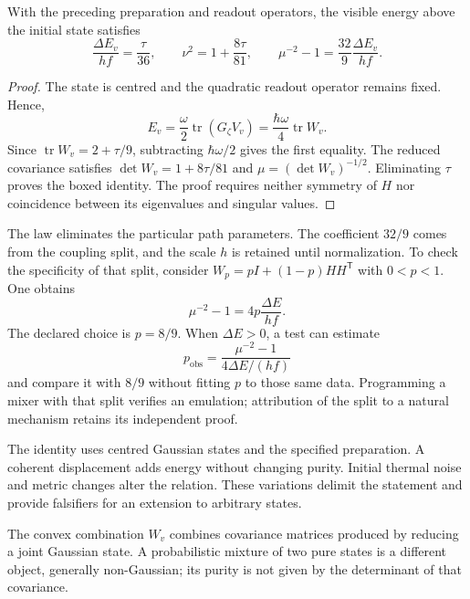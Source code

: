 \begin{proposition}
\label{md:aux:prop-energia-pureza}
With the preceding preparation and readout operators, the visible
energy above the initial state satisfies
\begin{equation}
 \frac{\Delta E_v}{hf}=\frac\tau{36},\qquad
 \nu^2=1+\frac{8\tau}{81},\qquad
 \boxed{\mu^{-2}-1=\frac{32}{9}\frac{\Delta E_v}{hf}.}
 \label{md:aux:identidad-energia-pureza}
\end{equation}
\end{proposition}
\begin{proof}
The state is centred and the quadratic readout operator remains fixed.
Hence,
\[
 E_v=\frac\omega2\operatorname{tr}(G_\zeta V_v)
 =\frac{\hbar\omega}{4}\operatorname{tr}W_v.
\]
Since $\operatorname{tr}W_v=2+\tau/9$, subtracting
$\hbar\omega/2$ gives the first equality.
The reduced covariance satisfies
$\det W_v=1+8\tau/81$ and $\mu=(\det W_v)^{-1/2}$.
Eliminating $\tau$ proves the boxed identity.
The proof requires neither symmetry of $H$ nor coincidence between
its eigenvalues and singular values.
\end{proof}

The law eliminates the particular path parameters.
The coefficient $32/9$ comes from the coupling split, and the scale
$h$ is retained until normalization.
To check the specificity of that split, consider
$W_p=pI+(1-p)HH^{\mathsf T}$ with $0<p<1$. One obtains
\begin{equation}
 \mu^{-2}-1=4p\frac{\Delta E}{hf}.
 \label{md:aux:reparto-general}
\end{equation}
The declared choice is $p=8/9$. When $\Delta E>0$, a test can estimate
\begin{equation}
 p_{\mathrm{obs}}=
 \frac{\mu^{-2}-1}{4\Delta E/(hf)}
 \label{md:aux:reparto-observado}
\end{equation}
and compare it with $8/9$ without fitting $p$ to those same data.
Programming a mixer with that split verifies an emulation;
attribution of the split to a natural mechanism retains its
independent proof.

The identity uses centred Gaussian states and the specified
preparation. A coherent displacement adds energy without changing
purity. Initial thermal noise and metric changes alter the relation.
These variations delimit the statement and provide falsifiers for
an extension to arbitrary states.

The convex combination $W_v$ combines covariance matrices produced
by reducing a joint Gaussian state. A probabilistic mixture of two
pure states is a different object, generally non-Gaussian; its purity
is not given by the determinant of that covariance.

